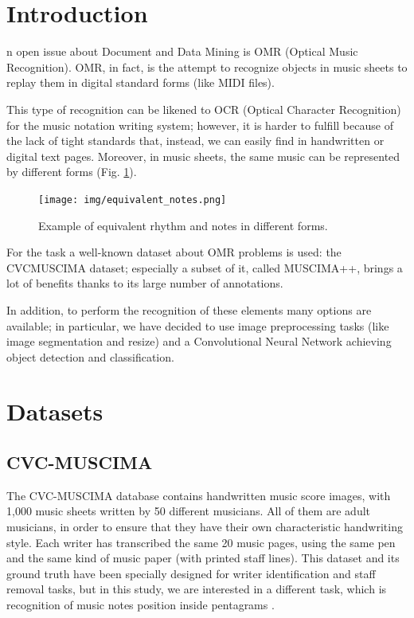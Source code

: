 \documentclass[journal]{IEEEtran}
\begin{document}
	\section{Introduction}
	
	n open issue about Document and Data Mining is OMR (Optical Music Recognition). OMR, in fact, is the attempt to recognize objects in music sheets to replay them in digital standard forms (like MIDI files).
	
	This type of recognition can be likened to OCR (Optical Character Recognition) for the music notation writing system; however, it is harder to fulfill because of the lack of tight standards that, instead, we can easily find in handwritten or digital text pages. Moreover, in music sheets, the same music can be represented by different forms (Fig. \ref{fig:equivalent_notes}).
	\\
	\begin{figure} [h]
		\begin{center}
			\texttt{[image: img/equivalent\_notes.png]}\\
			\caption{Example of equivalent rhythm and notes in different forms.}
			\label{fig:equivalent_notes}
		\end{center}
	\end{figure}
	
	For the task a well-known dataset about OMR problems is used: the CVCMUSCIMA dataset; especially a subset of it, called MUSCIMA++, brings a lot of benefits thanks to its large number of annotations.
	
	In addition, to perform the recognition of these elements many options are available; in particular, we have decided to use image preprocessing tasks (like image segmentation and resize) and a Convolutional Neural Network achieving object detection and classification. 
	
	\section{Datasets}
	\subsection{CVC-MUSCIMA}
	The CVC-MUSCIMA database contains handwritten music score images, with 1,000 music sheets written by 50 different musicians. All of them are adult musicians, in order to ensure that they have their own characteristic handwriting style. Each writer has transcribed the same 20 music pages, using the same pen and the same kind of music paper (with printed staff lines). This dataset and its ground truth have been specially designed for writer identification and staff removal tasks, but in this study, we are interested in a different task, which is recognition of music notes position inside pentagrams \cite{CVCMUSCIMA-LINK}.
	
\end{document}
